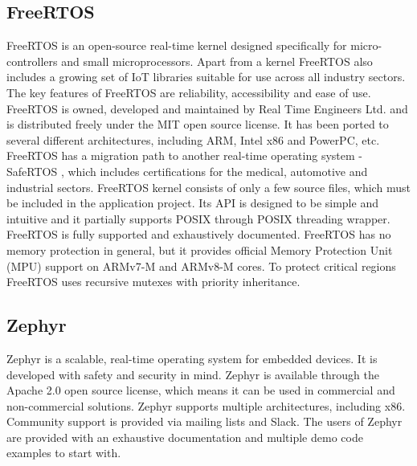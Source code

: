 \subsection{FreeRTOS}
FreeRTOS \cite{freertos2023} is an open-source real-time kernel designed specifically for micro-controllers and small microprocessors. Apart from a kernel FreeRTOS also includes a growing set of IoT libraries suitable for use across all industry sectors. The key features of FreeRTOS are reliability, accessibility and ease of use. FreeRTOS is owned, developed and maintained by Real Time Engineers Ltd. and is distributed freely under the MIT open source license. It has been ported to several diﬀerent architectures, including ARM, Intel x86 and PowerPC, etc. FreeRTOS has a migration path to another real-time operating system - SafeRTOS \cite{safertos2023}, which includes certifications for the medical, automotive and industrial sectors. FreeRTOS kernel consists of only a few source files, which must be included in the application project. Its API is designed to be simple and intuitive and it partially supports POSIX through POSIX threading wrapper. FreeRTOS is fully supported and exhaustively documented. FreeRTOS has no memory protection in general, but it provides oﬃcial Memory Protection Unit (MPU) support on ARMv7-M and ARMv8-M cores. To protect critical regions FreeRTOS uses recursive mutexes with priority inheritance.

\subsection{Zephyr} %
Zephyr \cite{zephyr2023} is a scalable, real-time operating system for embedded devices. It is developed with safety and security in mind. Zephyr is available through the Apache 2.0 open source license, which means it can be used in commercial and non-commercial solutions. Zephyr supports multiple architectures, including x86. Community support is provided via mailing lists and Slack. The users of Zephyr are provided with an exhaustive documentation and multiple demo code examples to start with.

